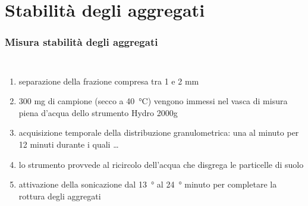 \documentclass[10pt]{beamer}
\begin{document}
\section{Stabilit\`a degli aggregati}
\begin{frame}
  \frametitle{Misura stabilit\`a degli aggregati}
  \begin{columns}
      \pause
      \begin{enumerate}[<+->] 
      \item separazione della frazione compresa tra 1 e 2 mm  
      \item 300 mg di campione (secco a \SI{40}{\celsius}) vengono immessi
        nel vasca di misura piena d'acqua dello strumento Hydro 2000g
      \item acquisizione temporale della distribuzione granulometrica:
        una al minuto per 12 minuti durante i quali \ldots
      \item lo strumento provvede al ricircolo dell'acqua che disgrega
        le particelle di suolo
      \item attivazione della sonicazione dal \SI{13}{\degree} al
        \SI{24}{\degree} minuto per completare la rottura degli
        aggregati


\end{enumerate}
\end{columns}
\end{frame}
\end{document}
